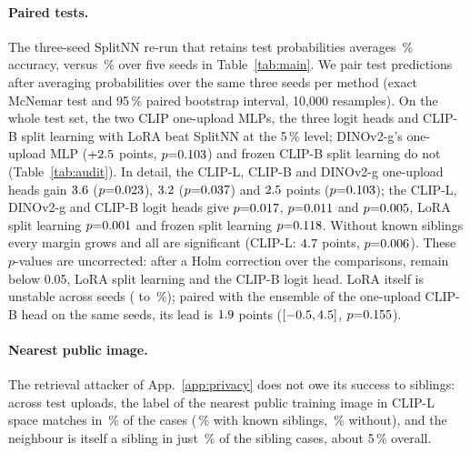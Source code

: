 \paragraph{Paired tests.}
The three-seed SplitNN re-run that retains test probabilities averages \auSnAll\,\% accuracy, versus \reproAcc\,\% over five seeds in Table~\ref{tab:main}. We pair test predictions after averaging probabilities over the same three seeds per method (exact McNemar test and 95\,\% paired bootstrap interval, 10{,}000 resamples). On the whole test set, the two CLIP one-upload MLPs, the three logit heads and CLIP-B split learning with LoRA beat SplitNN at the 5\,\% level; DINOv2-g's one-upload MLP ($+2.5$ points, $p{=}0.103$) and frozen CLIP-B split learning do not (Table~\ref{tab:audit}). In detail, the CLIP-L, CLIP-B and DINOv2-g one-upload heads gain $3.6$ ($p{=}0.023$), $3.2$ ($p{=}0.037$) and $2.5$ points ($p{=}0.103$); the CLIP-L, DINOv2-g and CLIP-B logit heads give $p{=}0.017$, $p{=}0.011$ and $p{=}0.005$, LoRA split learning $p{=}0.001$ and frozen split learning $p{=}0.118$. Without known siblings every margin grows and all are significant (CLIP-L: $4.7$ points, $p{=}0.006$). These $p$-values are uncorrected: after a Holm correction over the \holmN{} comparisons, \holmSurvive{} remain below 0.05, LoRA split learning and the CLIP-B logit head. LoRA itself is unstable across seeds (\seedLoraMin{} to \seedLoraMax\,\%); paired with the ensemble of the one-upload CLIP-B head on the same seeds, its lead is $1.9$ points ($[-0.5,4.5]$, $p{=}0.155$).

\paragraph{Nearest public image.}
The retrieval attacker of App.~\ref{app:privacy} does not owe its success to siblings: across test uploads, the label of the nearest public training image in CLIP-L space matches in \nnPubAll\,\% of the cases (\nnPubSib\,\% with known siblings, \nnPubNoSib\,\% without), and the neighbour is itself a sibling in just \nnPubIsSib\,\% of the sibling cases, about 5\,\% overall.

